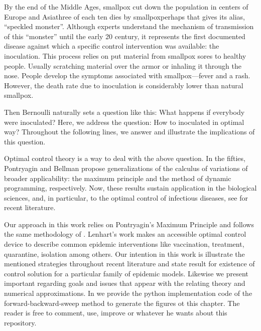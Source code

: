   By the end of the Middle Ages, smallpox cut down the 
population in centers of Europe and Asia\textemdash three of each ten dies by 
smallpox\textemdash perhaps that gives its alias, ``speckled monster''.  
Although experts understand the mechanism of transmission of this  ``monster''
until the early 20  century, it represents the first documented disease
\citep[][]{bernoulli1760essai, bradley1971smallpox, Foppa2017} against which a
specific control intervention was available: the inoculation. This process
relies on put material from smallpox sores to healthy people. Usually scratching
material over the armor or inhaling it through the nose. People develop the
symptoms associated with smallpox---fever and a rash. However, the death rate
due to inoculation is considerably lower than natural smallpox.

  Then Bernoulli naturally sets a question like this: What happens if everybody
were inoculated? Here, we address the question: How to inoculated in optimal
way? Throughout the following lines, we answer and illustrate the
implications of this question. 

  Optimal control theory is a way to deal with the above question.  In the
fifties, Pontryagin and Bellman propose generalizations of the calculus of
variations of broader applicability:  the maximum principle and the method of
dynamic programming, respectively. Now, these results sustain application in the
biological sciences, and, in particular, to the optimal control
of infectious diseases, see  \cite{Yu2018,Lahrouz2018,Jang2018,Cai2017b}
for recent literature.

  Our approach in this work relies on Pontryagin's Maximum
Principle \cite{pontryagin1962} and follows the same methodology of
\citet{lenhart2007optimal}. Lenhart's work makes an accessible optimal control
device to describe common epidemic interventions like vaccination, treatment,
quarantine, isolation among others. Our intention in this work is illustrate
the mentioned strategies throughout recent literature and state result for
existence of control solution for a particular family of epidemic models.
Likewise we present  important regarding goals and issues that appear with the
relating theory and numerical approximations. In \cite{python_repo} we provide 
the python implementation code of the forward-backward-sweep method  to generate
the figures ot this chapter. The reader is free to comment, use, improve or 
whatever he wants about this repository.
























